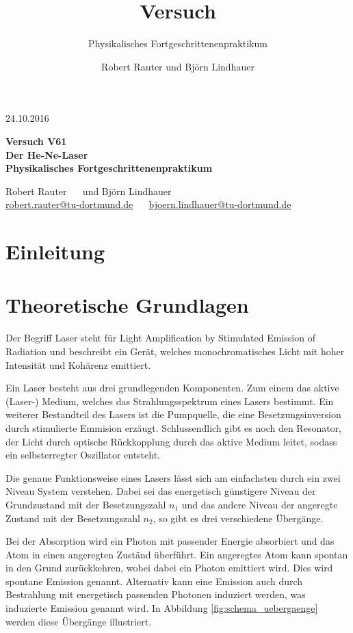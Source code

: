 \documentclass[]{scrartcl}
\title{Versuch \versuchnummer\\ \versuchname}
\subtitle{Physikalisches Fortgeschrittenenpraktikum}
\author{Robert Rauter und Björn Lindhauer}
\date{\versuchdatum}
\newcommand{\versuchnummer}{V61}
\newcommand{\versuchname}{Der He-Ne-Laser}
\newcommand{\versuchdatum}{24.10.2016}
\begin{document}
\begin{titlepage}
{\large \versuchdatum}
\vspace{7cm}
\begin{center}
\textbf{\huge Versuch \versuchnummer}\\\vspace{0.5cm}
\textbf{\huge \versuchname}\\
\vspace{0.2cm}
\textbf{ Physikalisches Fortgeschrittenenpraktikum}\\
\vspace{9cm}

{\Large Robert Rauter \ \ \hspace{1.5cm} und \hspace{1.5cm} Björn Lindhauer}\\
{ \url{robert.rauter@tu-dortmund.de} \ \ \hspace{2cm} \url{bjoern.lindhauer@tu-dortmund.de}}
\end{center}
\end{titlepage}
\section{Einleitung}

\section{Theoretische Grundlagen}
Der Begriff Laser steht für Light Amplification by Stimulated Emission of Radiation und beschreibt ein Gerät, welches monochromatisches Licht mit hoher Intensität und Kohärenz emittiert.

Ein Laser besteht aus drei grundlegenden Komponenten. Zum einem das aktive (Laser-) Medium, welches das Strahlungsspektrum eines Lasers bestimmt.
Ein weiterer Bestandteil des Lasers ist die Pumpquelle, die eine Besetzungsinversion durch stimulierte Emmision erzäugt. 
Schlussendlich gibt es noch den Resonator, der Licht durch optische Rückkopplung durch das aktive Medium leitet, sodass ein selbsterregter Oszillator entsteht.

Die genaue Funktionsweise eines Lasers lässt sich am einfachsten durch ein zwei Niveau System verstehen. 
Dabei sei das energetisch günstigere Niveau der Grundzustand mit der Besetzungszahl $n_1$ und das andere Niveau der angeregte Zustand mit der Besetzungszahl $n_2$, so gibt es drei verschiedene Übergänge.

Bei der Absorption wird ein Photon mit passender Energie absorbiert und das Atom in einen angeregten Zuständ überführt. 
Ein angeregtes Atom kann spontan in den Grund zurückkehren, wobei dabei ein Photon emittiert wird. Dies wird spontane Emission genannt.
Alternativ kann eine Emission auch durch Bestrahlung mit energetisch passenden Photonen induziert werden, was induzierte Emission genannt wird.
In Abbildung \ref{fig:schema_uebergaenge} werden diese Übergänge illustriert.
\end{document}
